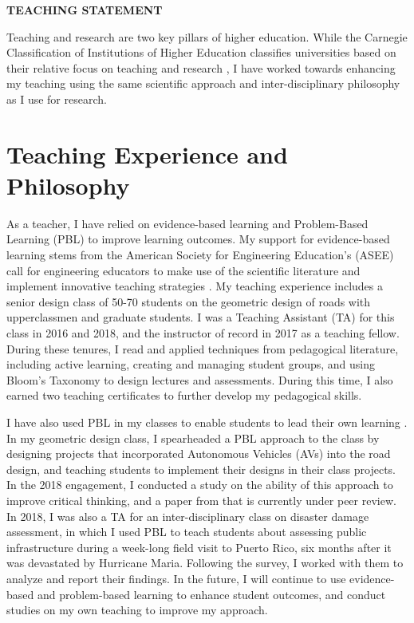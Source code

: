 \documentclass[12pt]{article}
\begin{document}
 \sloppy %
\begin{center}
{\large \uppercase{\textbf{Teaching Statement}}}
\end{center}

Teaching and research are two key pillars of higher education. While the Carnegie Classification of Institutions of Higher Education classifies universities based on their relative focus on teaching and research \cite{carnegie1994classification}, I have worked towards enhancing my teaching using the same scientific approach and inter-disciplinary philosophy as I use for research.

\section*{Teaching Experience and Philosophy}
As a teacher, I have relied on evidence-based learning and Problem-Based Learning (PBL) to improve learning outcomes. My support for evidence-based learning stems from the American Society for Engineering Education's (ASEE) call for engineering educators to make use of the scientific literature and implement innovative teaching strategies \cite{jamieson2009creating}. My teaching experience includes a senior design class of 50-70 students on the geometric design of roads with upperclassmen and graduate students. I was a Teaching Assistant (TA) for this class in 2016 and 2018, and the instructor of record in 2017 as a teaching fellow. During these tenures, I read and applied techniques from pedagogical literature, including active learning, creating and managing student groups, and using Bloom's Taxonomy to design lectures and assessments. During this time, I also earned two teaching certificates to further develop my pedagogical skills. 

I have also used PBL in my classes to enable students to lead their own learning \cite{albanese1993problem}. In my geometric design class, I spearheaded a PBL approach to the class by designing projects that incorporated Autonomous Vehicles (AVs) into the road design, and teaching students to implement their designs in their class projects. In the 2018 engagement, I conducted a study on the ability of this approach to improve critical thinking, and a paper from that is currently under peer review. In 2018, I was also a TA for an inter-disciplinary class on disaster damage assessment, in which I used PBL to teach students about assessing public infrastructure during a week-long field visit to Puerto Rico, six months after it was devastated by Hurricane Maria. Following the survey, I worked with them to analyze and report their findings. In the future, I will continue to use evidence-based and problem-based learning to enhance student outcomes, and conduct studies on my own teaching to improve my approach.
\end{document}
